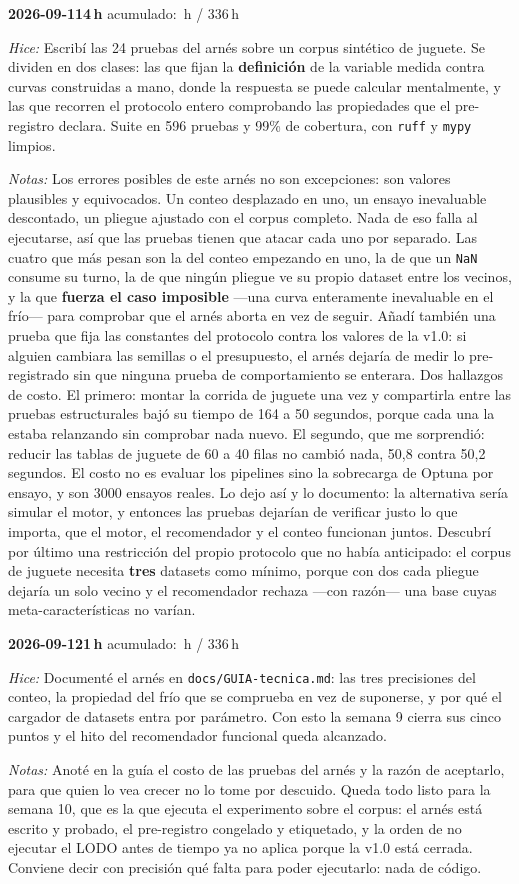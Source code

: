 \documentclass[11pt,letterpaper]{article}
\newcommand{\presupuesto}{336}
\newcommand{\horasacum}{0}
\newcommand{\entrada}[4]{%
  \xdef\horasacum{\fpeval{\horasacum + #2}}%
  \par\medskip
  \noindent\textbf{\color{tecnavy}#1}\quad\textbf{#2\,h}%
  \hfill{\small\color{gris}acumulado: \horasacum\,h / \presupuesto\,h}\par
  \nopagebreak
  \noindent\textit{Hice:} #3\par
  \nopagebreak
  \noindent\textit{Notas:} #4\par
}
\begin{document}
\entrada{2026-09-11}{4}
{Escribí las 24 pruebas del arnés sobre un corpus sintético de juguete. Se dividen en dos
 clases: las que fijan la \textbf{definición} de la variable medida contra curvas
 construidas a mano, donde la respuesta se puede calcular mentalmente, y las que recorren el
 protocolo entero comprobando las propiedades que el pre-registro declara. Suite en 596
 pruebas y 99\% de cobertura, con \texttt{ruff} y \texttt{mypy} limpios.}
{Los errores posibles de este arnés no son excepciones: son valores plausibles y
 equivocados. Un conteo desplazado en uno, un ensayo inevaluable descontado, un pliegue
 ajustado con el corpus completo. Nada de eso falla al ejecutarse, así que las pruebas
 tienen que atacar cada uno por separado. Las cuatro que más pesan son la del conteo
 empezando en uno, la de que un \texttt{NaN} consume su turno, la de que ningún pliegue ve
 su propio dataset entre los vecinos, y la que \textbf{fuerza el caso imposible} —una curva
 enteramente inevaluable en el frío— para comprobar que el arnés aborta en vez de seguir.
 Añadí también una prueba que fija las constantes del protocolo contra los valores de la
 v1.0: si alguien cambiara las semillas o el presupuesto, el arnés dejaría de medir lo
 pre-registrado sin que ninguna prueba de comportamiento se enterara. Dos hallazgos de
 costo. El primero: montar la corrida de juguete una vez y compartirla entre las pruebas
 estructurales bajó su tiempo de 164 a 50 segundos, porque cada una la estaba relanzando sin
 comprobar nada nuevo. El segundo, que me sorprendió: reducir las tablas de juguete de 60 a
 40 filas no cambió nada, 50,8 contra 50,2 segundos. El costo no es evaluar los pipelines
 sino la sobrecarga de Optuna por ensayo, y son 3000 ensayos reales. Lo dejo así y lo
 documento: la alternativa sería simular el motor, y entonces las pruebas dejarían de
 verificar justo lo que importa, que el motor, el recomendador y el conteo funcionan juntos.
 Descubrí por último una restricción del propio protocolo que no había anticipado: el corpus
 de juguete necesita \textbf{tres} datasets como mínimo, porque con dos cada pliegue dejaría
 un solo vecino y el recomendador rechaza —con razón— una base cuyas meta-características no
 varían.}

\entrada{2026-09-12}{1}
{Documenté el arnés en \texttt{docs/GUIA-tecnica.md}: las tres precisiones del conteo, la
 propiedad del frío que se comprueba en vez de suponerse, y por qué el cargador de datasets
 entra por parámetro. Con esto la semana 9 cierra sus cinco puntos y el hito del recomendador
 funcional queda alcanzado.}
{Anoté en la guía el costo de las pruebas del arnés y la razón de aceptarlo, para que quien
 lo vea crecer no lo tome por descuido. Queda todo listo para la semana 10, que es la que
 ejecuta el experimento sobre el corpus: el arnés está escrito y probado, el pre-registro
 congelado y etiquetado, y la orden de no ejecutar el LODO antes de tiempo ya no aplica
 porque la v1.0 está cerrada. Conviene decir con precisión qué falta para poder ejecutarlo:
 nada de código.}
\end{document}

